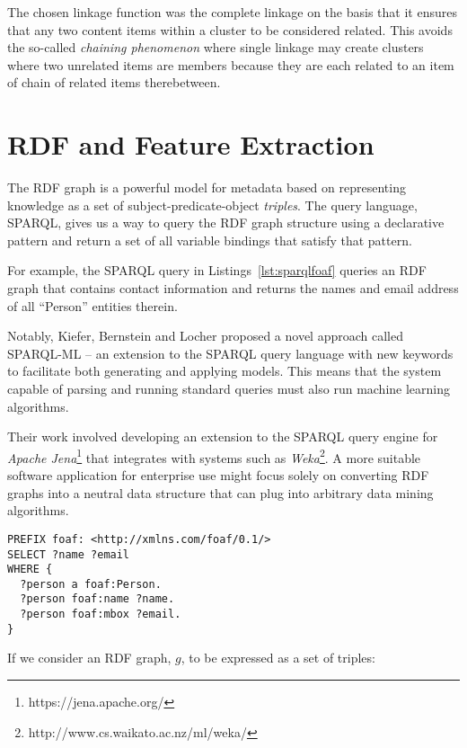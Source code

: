 The chosen linkage function was the complete linkage
on the basis that it ensures that any two content items
within a cluster to be considered related. This avoids the so-called
\emph{chaining phenomenon} where single linkage may create clusters
where two unrelated items are members because they are each related
to an item of chain of related items
therebetween.\cite{everitt2011hierarchical}

\section{RDF and Feature Extraction}
\label{sec:rdf-and-features}

The RDF graph is a powerful model
for metadata based on representing knowledge as a set of
subject-predicate-object \emph{triples}. The query language, SPARQL, gives us a
way to query the RDF graph structure using a declarative pattern and return a
set of all variable bindings that satisfy that pattern.

For example, the SPARQL query in Listings~\ref{lst:sparqlfoaf}
queries an RDF graph that contains contact information and returns the
names and email address of all ``Person'' entities therein.

Notably, Kiefer, Bernstein and Locher\cite{kiefer2008adding} proposed a novel
approach called SPARQL-ML -- an extension to the
SPARQL\cite{segaran2009programming} query language with new keywords to
facilitate both generating and applying models. This means that the system
capable of parsing and running standard queries must also run machine learning
algorithms.

Their work involved developing an extension to the SPARQL query
engine for \emph{Apache Jena}\footnote{https://jena.apache.org/} that integrates
with systems such as \emph{Weka}\footnote{http://www.cs.waikato.ac.nz/ml/weka/}.
A more suitable software application for enterprise use might focus solely on
converting RDF graphs into a neutral data structure that can plug into arbitrary
data mining algorithms.

\begin{lstlisting}[label=lst:sparqlfoaf,caption={Example SPARQL query for people's names and email addresses},language=sparql]
PREFIX foaf: <http://xmlns.com/foaf/0.1/>
SELECT ?name ?email
WHERE {
  ?person a foaf:Person.
  ?person foaf:name ?name.
  ?person foaf:mbox ?email.
}
\end{lstlisting}

If we consider an RDF graph, $g$, to be expressed as a set of triples:

